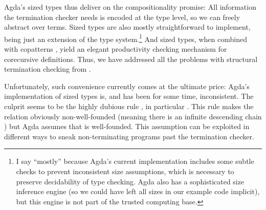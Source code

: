 Agda's sized types thus deliver on the compositionality promise: All information
the termination checker needs is encoded at the type level, so we can freely
abstract over terms. Sized types are also mostly straightforward to implement,
being just an extension of the type system.\footnote{I say \enquote{mostly}
  because Agda's current implementation includes some subtle checks to prevent
  inconsistent size assumptions, which is necessary to preserve decidability of
  type checking. Agda also has a sophisticated size inference engine (so we
  could have left all sizes in our example code implicit), but this engine is
  not part of the trusted computing base.} And sized types, when combined with
copatterns \cite{abel2016}, yield an elegant productivity checking mechanism for
corecursive definitions. Thus, we have addressed all the problems with
structural termination checking from .

Unfortunately, such convenience currently comes at the ultimate price: Agda's
implementation of sized types is, and has been for some time, inconsistent. The
culprit seems to be the highly dubious rule , in particular
. This rule makes the \icode{<} relation obviously non-well-founded
(meaning there is an infinite descending chain ) but Agda
assumes that \icode{<} is well-founded. This assumption can be exploited in
different ways \cite{agdabug2015,agdabug2016,agdabug2017,agdabug2018} to sneak
non-terminating programs past the termination checker.
